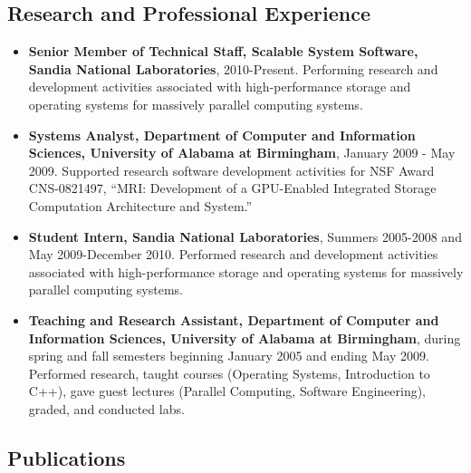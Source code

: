 \documentclass[11pt]{article}
\begin{document}
\subsection{Research and Professional Experience}
\begin{itemize}
\item {\bf Senior Member of Technical Staff, Scalable System Software,
  Sandia National Laboratories}, 2010-Present. Performing research
  and development activities associated with high-performance storage
  and operating systems for massively parallel computing systems.
\item {\bf Systems Analyst, Department of Computer and Information
  Sciences, University of Alabama at Birmingham}, January 2009 - May
  2009. Supported research software development activities for NSF
  Award CNS-0821497, ``MRI: Development of a GPU-Enabled Integrated
  Storage Computation Architecture and System.''
\item {\bf Student Intern, Sandia National Laboratories}, Summers
  2005-2008 and May 2009-December 2010. Performed research and
  development activities associated with high-performance storage and
  operating systems for massively parallel computing systems.
\item {\bf Teaching and Research Assistant, Department of Computer and
  Information Sciences, University of Alabama at Birmingham}, during
  spring and fall semesters beginning January 2005 and ending May
  2009. Performed research, taught courses (Operating Systems,
  Introduction to C++), gave guest lectures (Parallel Computing,
  Software Engineering), graded, and conducted labs.
\end{itemize}

\subsection{Publications}
\end{document}
